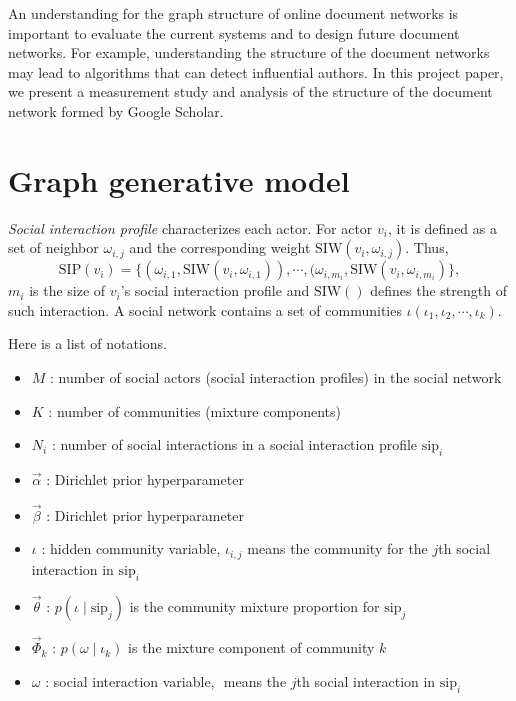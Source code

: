 \documentclass[letterpaper]{article}
\begin{document}
An understanding for the graph structure of online document networks is important to evaluate the current systems and to design future document networks. 
For example, understanding the structure of the document networks may lead to algorithms that can detect influential authors.
In this project paper, we present a measurement study and analysis of the structure of the document network formed by Google Scholar. 

\section{Graph generative model}

\emph{Social interaction profile} characterizes each actor.
For actor $ v_{i} $, it is defined as a set of neighbor $ \omega_{i,j} $ and the corresponding weight $ \mbox{SIW}(v_{i}, \omega_{i,j}) $.
Thus,
\begin{equation}
\mbox{SIP}(v_{i}) = \{ (\omega_{i,1}, \mbox{SIW}(v_{i}, \omega_{i,1})) , \cdots , (\omega_{i,m_{i}}, \mbox{SIW}(v_{i}, \omega_{i,m_{i}}) \},
\end{equation}
$ m_{i} $ is the size of $ v_{i} $'s social interaction profile and $ \mbox{SIW}() $ defines the strength of such interaction.
A social network contains a set of communities $ \iota( \iota_{1} , \iota_{2} , \cdots , \iota_{k} ) $.

Here is a list of notations.
\begin{itemize}
	\item $ M $ : number of social actors (social interaction profiles) in the social network
	\item $ K $ : number of communities (mixture components)
	\item $ N_{i} $ : number of social interactions in a social interaction profile $ \mbox{sip}_{i} $
	\item $ \vec{\alpha} $ : Dirichlet prior hyperparameter
	\item $ \vec{\beta} $ : Dirichlet prior hyperparameter
	\item $ \iota $ : hidden community variable, $ \iota_{i,j} $ means the community for the $ j $th social interaction in $ \mbox{sip}_{i} $
	\item $ \vec{\theta} $ : $ p(\iota \mid \mbox{sip}_{j}) $ is the community mixture proportion for $ \mbox{sip}_{j} $ 
	\item $ \vec{\Phi}_{k} $ : $ p(\omega \mid \iota_{k} ) $ is the mixture component of community $ k $
	\item $ \omega $ : social interaction variable, $ $ means the $ j $th social interaction in $ \mbox{sip}_{i} $
\end{itemize}
\end{document}
